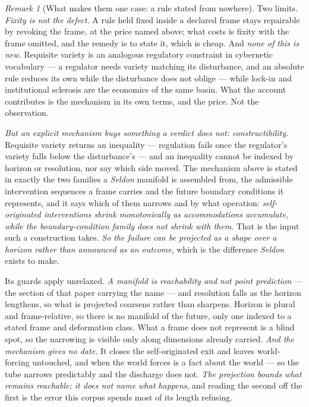 \documentclass[11pt,a4paper]{article}
\theoremstyle{remark}
\newtheorem{remark}[definition]{Remark}
\begin{document}
\begin{remark}[What makes them one case: a rule stated from nowhere]
Two limits. \emph{Fixity is not the defect.} A rule held fixed inside a declared frame stays repairable
by revoking the frame, at the price named above; what costs is fixity with the frame omitted, and the
remedy is to state it, which is cheap. And \emph{none of this is new.} Requisite variety
\citep{ashby1956} is an analogous regulatory constraint in cybernetic vocabulary --- a regulator needs variety matching
its disturbance, and an absolute rule reduces its own while the disturbance does not oblige --- while
lock-in \citep{arthur1989} and institutional sclerosis \citep{olson1982} are the economics of the same
basin. What the account contributes is the mechanism in its own terms, and the price. Not the
observation.

\emph{But an explicit mechanism buys something a verdict does not: constructibility.} Requisite variety
returns an inequality --- regulation fails once the regulator's variety falls below the disturbance's
--- and an inequality cannot be indexed by horizon or resolution, nor say which side moved. The
mechanism above is stated in exactly the two families a \emph{Seldon} manifold is assembled from, the
admissible intervention sequences a frame carries and the future boundary conditions it represents, and
it says which of them narrows and by what operation: \emph{self-originated interventions shrink
monotonically as accommodations accumulate, while the boundary-condition family does not shrink with
them}. That is the input such a construction takes. \emph{So the failure can be projected as a shape
over a horizon rather than announced as an outcome}, which is the difference \emph{Seldon}
exists to make.

Its guards apply unrelaxed. \emph{A manifold is reachability and not point prediction} --- the section
of that paper carrying the name --- and resolution falls as the horizon lengthens, so what is projected
coarsens rather than sharpens. Horizon is plural and frame-relative, so there is no manifold of the
future, only one indexed to a stated frame and deformation class. What a frame does not represent is a
blind spot, so the narrowing is visible only along dimensions already carried. \emph{And the mechanism
gives no date.} It closes the self-originated exit and leaves world-forcing untouched, and when the
world forces is a fact about the world --- so the tube narrows predictably and the discharge does not.
\emph{The projection bounds what remains reachable; it does not name what happens}, and reading the
second off the first is the error this corpus spends most of its length refusing.
\end{remark}
\end{document}
